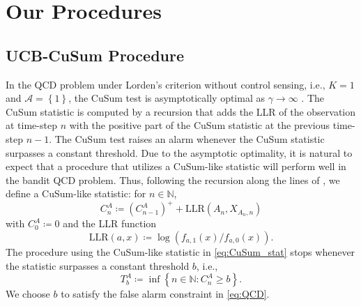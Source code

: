 \documentclass[letterpaper, 10 pt, conference]{ieeeconf}  %
\newcommand{\lp}{\left(}
\newcommand{\rp}{\right)}
\newcommand{\lbp}{\left\{}
\newcommand{\rbp}{\right\}}
\newcommand{\mcal}{\mathcal}
\newcommand{\mrm}{\mathrm}
\newcommand{\mbb}{\mathbb}
\begin{document}
\section{Our Procedures}

\subsection{UCB-CuSum Procedure}
In the QCD problem under Lorden's criterion without control sensing, i.e., $K=1$ and $\mcal{A} = \lbp 1 \rbp$, the CuSum test \cite{page1954continuous} is asymptotically optimal as $\gamma \to \infty$ \cite{lorden1971procedures, lai1998information}. The CuSum statistic is computed by a recursion that adds the LLR of the observation at time-step $n$ with the positive part of the CuSum statistic at the previous time-step $n-1$. The CuSum test raises an alarm whenever the CuSum statistic surpasses a constant threshold. Due to the asymptotic optimality, it is natural to expect that a procedure that utilizes a CuSum-like statistic will perform well in the bandit QCD problem. Thus, following the recursion along the lines of \cite{zhang2023bandit,veeravalli2024quickest}, we define a CuSum-like statistic: for $n \in \mbb{N}$,
%
\begin{equation}\label{eq:CuSum_stat}
    C_{n}^{A} \coloneqq \lp C_{n-1}^{A} \rp^{+} + \mrm{LLR} \lp A_{n}, X_{A_{n}, n} \rp
\end{equation}
%
with $C_{0}^{A} \coloneqq 0$ and the LLR function
%
\begin{equation}\label{eq:LLR}
    \mrm{LLR} \lp a, x \rp \coloneqq \log \lp f_{a, 1}\lp x \rp/f_{a, 0} \lp x \rp \rp.
\end{equation}
%
The procedure using the CuSum-like statistic in \eqref{eq:CuSum_stat} stops whenever the statistic surpasses a constant threshold $b$, i.e.,
%
\begin{equation}\label{eq:CuSum_T}
    T_{b}^{A} \coloneqq \inf \lbp n \in \mbb{N}: C_{n}^{A} \geq b \rbp.
\end{equation}
%
We choose $b$ to satisfy the false alarm constraint in \eqref{eq:QCD}.
\end{document}
